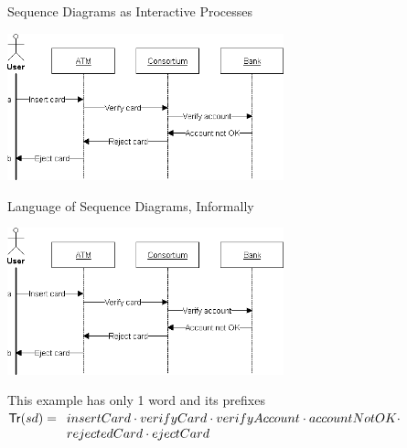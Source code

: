 \documentclass[aspectratio=169]{beamer}
\begin{document}
\begin{slide}{Sequence Diagrams as Interactive Processes}
  \centering

  \includegraphics[width=0.6\textwidth]{images/sd-simple-atm.png}

\end{slide}

\begin{slide}{Language of Sequence Diagrams, Informally}
  \centering

  \includegraphics[width=0.6\textwidth]{images/sd-simple-atm.png}

  \begin{exampleblock}{This example has only 1 word and its prefixes}
   $\mathsf{Tr}(sd) = \begin{array}[t]{l}
      insertCard \cdot verifyCard \cdot verifyAccount \cdot accountNotOK \cdot \\ rejectedCard \cdot ejectCard
      \end{array}$
  \end{exampleblock}
\end{slide}
\end{document}
